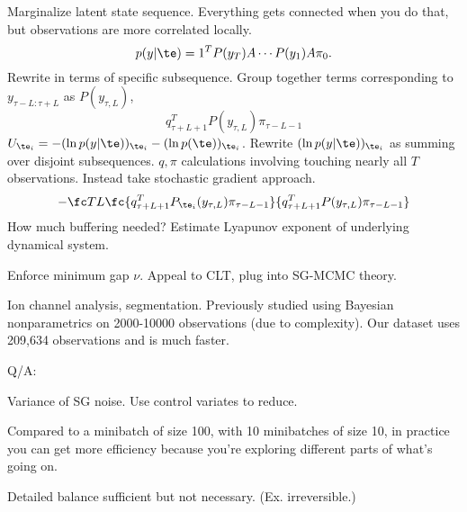 Marginalize latent state sequence. Everything gets connected when you do that, but observations are more correlated locally. 
$$
p(y|\te) = 1^T P(y_T)A \cdots P(y_1)A\pi_0.
$$
Rewrite in terms of specific subsequence. Group together terms corresponding to $y_{\tau-L:\tau+L}$ as $P(y_{\tau,L})$,
$$
q_{\tau+L+1}^T P(y_{\tau, L})\pi_{\tau - L -1}
$$
$U_{\te_i} = -(\ln p(y|\te))_{\te_i} - (\ln p(\te))_{\te_i}$. Rewrite $(\ln p(y|\te))_{\te_i}$ as summing over disjoint subsequences. $q,\pi$ calculations involving touching nearly all $T$ observations. Instead take stochastic gradient approach.
$$
-\fc TL \fc{q_{\tau+L+1}^TP_{\te_i}(y_{\tau,L})\pi_{\tau - L -1}}{q_{\tau+L+1}^TP(y_{\tau,L})\pi_{\tau - L -1}}
$$
How much buffering needed? Estimate Lyapunov exponent of underlying dynamical system.

Enforce minimum gap $\nu$. 
Appeal to CLT, plug into SG-MCMC theory.

Ion channel analysis, segmentation. Previously studied using Bayesian nonparametrics on 2000-10000 observations (due to complexity). Our dataset uses 209,634 observations and is much faster.


Q/A:

Variance of SG noise. Use control variates to reduce. 

Compared to a minibatch of size 100, with 10 minibatches of size 10, in practice you can get more efficiency because you're exploring different parts of what's going on.

Detailed balance sufficient but not necessary. (Ex. irreversible.)